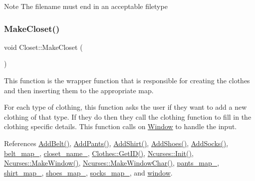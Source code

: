 \begin{DoxyNote}{Note}
The filename must end in an acceptable filetype 
\end{DoxyNote}
\mbox{\label{classCloset_a1b904dfcdafe293f3f530b338afc0601}} 
\subsubsection{\texorpdfstring{Make\+Closet()}{MakeCloset()}}
{\footnotesize\ttfamily void Closet\+::\+Make\+Closet (\begin{DoxyParamCaption}{ }\end{DoxyParamCaption})}



This function is the wrapper function that is responsible for creating the clothes and then inserting them to the appropriate map. 

For each type of clothing, this function asks the user if they want to add a new clothing of that type. If they do then they call the clothing function to fill in the clothing specific details. This function calls on \textquotesingle{}\mbox{\hyperlink{classWindow}{Window}}\textquotesingle{} to handle the input. 

References \mbox{\hyperlink{classCloset_ad81782f2bb110f3a0a635a5ac1f929eb}{Add\+Belt()}}, \mbox{\hyperlink{classCloset_a86001d9aab63ec5cca05bb2daa67e755}{Add\+Pants()}}, \mbox{\hyperlink{classCloset_aba3296cf8964b43f64911cc69c56cbfd}{Add\+Shirt()}}, \mbox{\hyperlink{classCloset_a489badac5a919460e8cc8e216f8b3eac}{Add\+Shoes()}}, \mbox{\hyperlink{classCloset_aac44ecf78525b3e0ac4ed80af2133186}{Add\+Socks()}}, \mbox{\hyperlink{classCloset_a0631fe46e3c955109a613e1cd1d2cb52}{belt\+\_\+map\+\_\+}}, \mbox{\hyperlink{classCloset_a3c06676b90e6ebe31d6dd276f2f0bcef}{closet\+\_\+name\+\_\+}}, \mbox{\hyperlink{classClothes_a3f6dac172f333126d19010f85ec44e4c}{Clothes\+::\+Get\+I\+D()}}, \mbox{\hyperlink{classNcurses_a9966b2b23b522e415232976acfa1d18f}{Ncurses\+::\+Init()}}, \mbox{\hyperlink{classNcurses_a1d8def11419a444c5696b5043da680d4}{Ncurses\+::\+Make\+Window()}}, \mbox{\hyperlink{classNcurses_a2b4916627ad802a840b95cf65766773f}{Ncurses\+::\+Make\+Window\+Char()}}, \mbox{\hyperlink{classCloset_a8be78859dfab9e2aa09bfbbb8f191dab}{pants\+\_\+map\+\_\+}}, \mbox{\hyperlink{classCloset_a8126a023a2777b84b23436da8d1f4b35}{shirt\+\_\+map\+\_\+}}, \mbox{\hyperlink{classCloset_ab1e1ce9110a044c90244407f0f6f92c4}{shoes\+\_\+map\+\_\+}}, \mbox{\hyperlink{classCloset_a33a48dfc5ef542261bb0dd373f899f9e}{socks\+\_\+map\+\_\+}}, and \mbox{\hyperlink{classCloset_af1eb4f786cc4eccd3018b90632236a93}{window}}.

